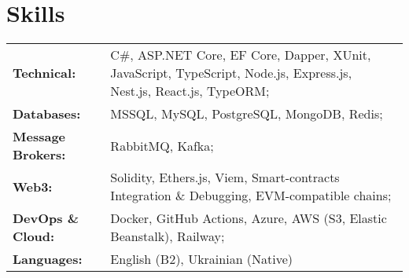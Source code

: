 \section{Skills}\label{sec:skills}

\begin{tabular}{p{} p{}}
    \textbf{Technical:}
    & C\#, ASP.NET Core, EF Core, Dapper, XUnit, JavaScript, TypeScript, Node.js, Express.js, Nest.js, React.js, TypeORM; \\
    \textbf{Databases:}
    & MSSQL, MySQL, PostgreSQL, MongoDB, Redis; \\
    \textbf{Message Brokers:}
    & RabbitMQ, Kafka; \\
    \textbf{Web3:}
    & Solidity, Ethers.js, Viem, Smart-contracts Integration \& Debugging, EVM-compatible chains; \\
    \textbf{DevOps \& Cloud:}
    & Docker, GitHub Actions, Azure, AWS (S3, Elastic Beanstalk), Railway; \\
    \textbf{Languages:}
    & English (B2), Ukrainian (Native)
\end{tabular}
